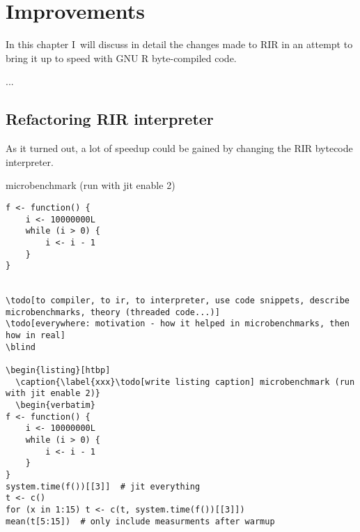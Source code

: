 \chapter{Improvements\label{improvements}}

In this chapter I~will discuss in detail the changes made to RIR in an attempt to bring it up to speed with GNU R byte-compiled code.


...

\section{Refactoring RIR interpreter}

As it turned out, a lot of speedup could be gained by changing the RIR bytecode interpreter. 

\begin{listing}[htbp]
  \caption{\label{xxx} microbenchmark (run with jit enable 2)}
  \begin{verbatim}
f <- function() {
    i <- 10000000L
    while (i > 0) {
        i <- i - 1
    }
}


\todo[to compiler, to ir, to interpreter, use code snippets, describe microbenchmarks, theory (threaded code...)]
\todo[everywhere: motivation - how it helped in microbenchmarks, then how in real]
\blind

\begin{listing}[htbp]
  \caption{\label{xxx}\todo[write listing caption] microbenchmark (run with jit enable 2)}
  \begin{verbatim}
f <- function() {
    i <- 10000000L
    while (i > 0) {
        i <- i - 1
    }
}
system.time(f())[[3]]  # jit everything
t <- c()
for (x in 1:15) t <- c(t, system.time(f())[[3]])
mean(t[5:15])  # only include measurments after warmup
  \end{verbatim}
\end{listing}


\blind[15]

